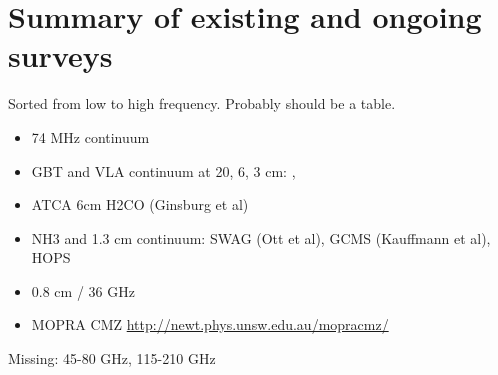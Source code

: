 \section{Summary of existing and ongoing surveys}
Sorted from low to high frequency.  Probably should be a table.

\begin{itemize}
    \item 74 MHz continuum \citep{Yusef-Zadeh2013c}
    \item GBT and VLA continuum at 20, 6, 3 cm: \citet{Law2008a}, \citet{Law2008b}
    \item ATCA 6cm H2CO (Ginsburg et al)
    \item NH3 and 1.3 cm continuum: SWAG (Ott et al), GCMS (Kauffmann et al), HOPS \citep{Walsh2011a}
    \item 0.8 cm / 36 GHz \citep{Yusef-Zadeh2013a}
    \item MOPRA CMZ \url{http://newt.phys.unsw.edu.au/mopracmz/} \citep{Jones2012a}
    
\end{itemize}

Missing: 45-80 GHz, 115-210 GHz